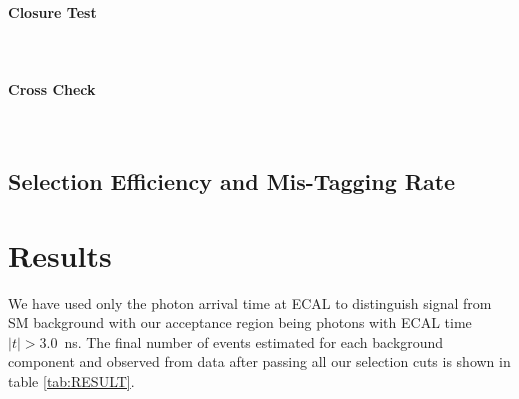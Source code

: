 \paragraph*{Closure Test} \mbox{}\\



 \paragraph*{Cross Check} \mbox{} \\
 
\subsection{Selection Efficiency and Mis-Tagging Rate}




\section{Results}
We have used only the photon arrival time at ECAL to distinguish signal from SM background with our acceptance region being photons with ECAL time $|t| > 3.0$~ns. The final number of events estimated for each background component and observed from data after passing all our selection cuts is shown in table \ref{tab:RESULT}.

